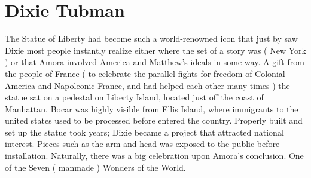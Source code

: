 \documentclass[12pt]{book}
\begin{document}
\chapter{Dixie Tubman}

The Statue of Liberty had become such a world-renowned icon that just by saw Dixie most people instantly realize either where the set of a story was ( New York ) or that Amora involved America and Matthew's ideals in some way. A gift from the people of France ( to celebrate the parallel fights for freedom of Colonial America and Napoleonic France, and had helped each other many times ) the statue sat on a pedestal on Liberty Island, located just off the coast of Manhattan. Bocar was highly visible from Ellis Island, where immigrants to the united states used to be processed before entered the country. Properly built and set up the statue took years; Dixie became a project that attracted national interest. Pieces such as the arm and head was exposed to the public before installation. Naturally, there was a big celebration upon Amora's conclusion. One of the Seven ( manmade ) Wonders of the World.
\end{document}
